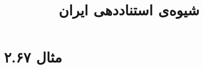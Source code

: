 \documentclass[a4paper,10pt]{article}
\begin{document}
\title{شیوه‌ی استناددهی ایران}
\author{}
\date{}
\maketitle



\section*{مثال ۲.۶۷}

\cite{اخوی}\\
\cite{پورممتاز1381}\\
\\
\\






\end{document}

